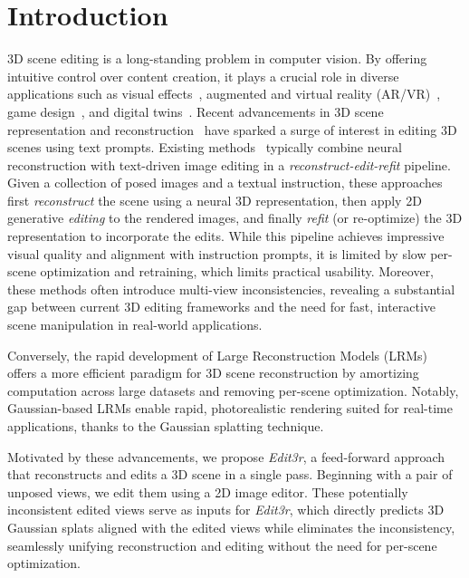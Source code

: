 \documentclass[10pt,twocolumn,letterpaper]{article}
\newcommand{\ourmethod}{\textit{Edit3r}}
\begin{document}
\section{Introduction}
\label{sec:intro}
3D scene editing is a long-standing problem in computer vision. By offering intuitive control over content creation, it plays a crucial role in diverse applications such as visual effects~\cite{zhang2025advancing3dgaussiansplatting}, augmented and virtual reality (AR/VR)~\cite{madhavaram2024trainingfreeapproach3d}, game design~\cite{xu2024sketch2sceneautomaticgenerationinteractive}, and digital twins~\cite{melnik2025digitaltwingenerationvisual}.
%
Recent advancements in 3D scene representation and reconstruction~\cite{nerf, 3dgs} have sparked a surge of interest in editing 3D scenes using text prompts. Existing methods~\cite{in2n, gaussctrl, lee2025editsplatmultiviewfusionattentionguided} typically combine neural reconstruction with text-driven image editing in a \textit{reconstruct-edit-refit} pipeline. Given a collection of posed images and a textual instruction, these approaches first \textit{reconstruct} the scene using a neural 3D representation, then apply 2D generative \textit{editing} to the rendered images, and finally \textit{refit} (or re-optimize) the 3D representation to incorporate the edits.
%
While this pipeline achieves impressive visual quality and alignment with instruction prompts, it is limited by slow per-scene optimization and retraining, which limits practical usability. Moreover, these methods often introduce multi-view inconsistencies, revealing a substantial gap between current 3D editing frameworks and the need for fast, interactive scene manipulation in real-world applications.

Conversely, the rapid development of Large Reconstruction Models (LRMs)~\cite{lrm, gslrm, noposplat, mvsnerf, pixelsplat, dust3r} offers a more efficient paradigm for 3D scene reconstruction by amortizing computation across large datasets and removing per-scene optimization. Notably, Gaussian-based LRMs enable rapid, photorealistic rendering suited for real-time applications, thanks to the Gaussian splatting technique.

Motivated by these advancements, we propose {\ourmethod}, a feed-forward approach that reconstructs and edits a 3D scene in a single pass.
%
Beginning with a pair of unposed views, we edit them using a 2D image editor. These potentially inconsistent edited views serve as inputs for {\ourmethod}, which directly predicts 3D Gaussian splats aligned with the edited views while eliminates the inconsistency, seamlessly unifying reconstruction and editing without the need for per-scene optimization.
\end{document}
